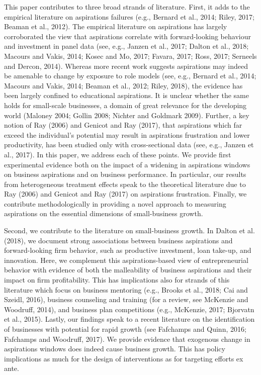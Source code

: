\documentclass[11.5pt]{article}
\begin{document}
This paper contributes to three broad strands of literature. First, it adds to the empirical literature on aspirations failures (e.g., Bernard et al., 2014; Riley, 2017; Beaman et al., 2012). The empirical literature on aspirations has largely corroborated the view that aspirations correlate with forward-looking behaviour and investment in panel data (see, e.g., Janzen et al., 2017; Dalton et al., 2018; Macours and Vakis, 2014; Kosec and Mo, 2017; Favara, 2017; Ross, 2017; Serneels and Dercon, 2014). Whereas more recent work suggests aspirations may indeed be amenable to change by exposure to role models (see, e.g., Bernard et al., 2014; Macours and Vakis, 2014; Beaman et al., 2012; Riley, 2018), the evidence has been largely confined to educational aspirations. It is unclear whether the same holds for small-scale businesses, a domain of great relevance for the developing world (Maloney 2004; Gollin 2008; Nichter and Goldmark 2009). Further, a key notion of Ray (2006) and Genicot and Ray (2017), that aspirations which far exceed the individual's potential may result in aspirations frustration and lower productivity, has been studied only with cross-sectional data (see, e.g., Janzen et al., 2017). In this paper, we address each of these points. We provide first experimental evidence both on the impact of a widening in aspirations windows on business aspirations and on business performance. In particular, our results from heterogeneous treatment effects speak to the theoretical literature due to Ray (2006) and Genicot and Ray (2017) on aspirations frustration. Finally, we contribute methodologically in providing a novel approach to measuring aspirations on the essential dimensions of small-business growth.

Second, we contribute to the literature on small-business growth. In Dalton et al. (2018), we document strong associations between business aspirations and forward-looking firm behavior, such as productive investment, loan take-up, and innovation. Here, we complement this aspirations-based view of entrepreneurial behavior with evidence of both the malleability of business aspirations and their impact on firm profitability. This has implications also for strands of this literature which focus on business mentoring (e.g., Brooks et al., 2018; Cai and Szeidl, 2016), business counseling and training (for a review, see McKenzie and Woodruff, 2014), and business plan competitions (e.g., McKenzie, 2017; Bjorvatn et al., 2015). Lastly, our findings speak to a recent literature on the identification of businesses with potential for rapid growth (see Fafchamps and Quinn, 2016; Fafchamps and Woodruff, 2017). We provide evidence that exogenous change in aspirations windows does indeed cause business growth. This has policy implications as much for the design of interventions as for targeting efforts ex ante.
\end{document}
